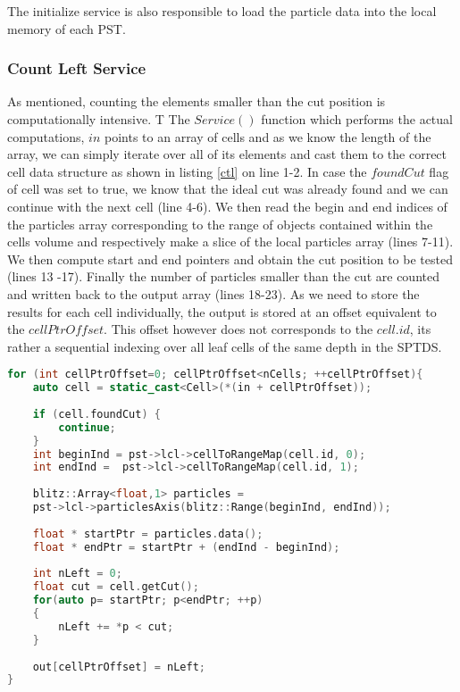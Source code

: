 \documentclass[]{article}
\begin{document}
The initialize service is also responsible to load the particle data into the local memory of each PST. 

\subsubsection{Count Left Service}

As mentioned, counting the elements smaller than the cut position is computationally intensive. T
The $Service()$ function which performs the actual computations, $in$ points to an array of cells and as we know the length of the array, we can simply iterate over all of its elements and cast them to the correct cell data structure as shown in listing \ref{ctl} on line 1-2. In case the $foundCut$ flag of cell was set to true, we know that the ideal cut was already found and we can continue with the next cell (line 4-6).
We then read the begin and end indices of the particles array corresponding to the range of objects contained within the cells volume and respectively make a slice of the local particles array (lines 7-11). We then compute start and end pointers and obtain the cut position to be tested (lines 13 -17). Finally the number of particles smaller than the cut are counted and written back to the output array (lines 18-23). As we need to store the results for each cell individually, the output is stored at an offset equivalent to the $cellPtrOffset$. This offset however does not corresponds to the $cell.id$, its rather a sequential indexing over all leaf cells of the same depth in the SPTDS. 


\begin{lstlisting}[language=c++, caption=Part of the Count Left Service() method, label=ctl]
for (int cellPtrOffset=0; cellPtrOffset<nCells; ++cellPtrOffset){
	auto cell = static_cast<Cell>(*(in + cellPtrOffset));
	
	if (cell.foundCut) {
		continue;
	}
	int beginInd = pst->lcl->cellToRangeMap(cell.id, 0);
	int endInd =  pst->lcl->cellToRangeMap(cell.id, 1);
	
	blitz::Array<float,1> particles =
	pst->lcl->particlesAxis(blitz::Range(beginInd, endInd));
	
	float * startPtr = particles.data();
	float * endPtr = startPtr + (endInd - beginInd);
	
	int nLeft = 0;
	float cut = cell.getCut();
	for(auto p= startPtr; p<endPtr; ++p)
	{
		nLeft += *p < cut;
	}
	
	out[cellPtrOffset] = nLeft;
}
\end{lstlisting}
\end{document}
